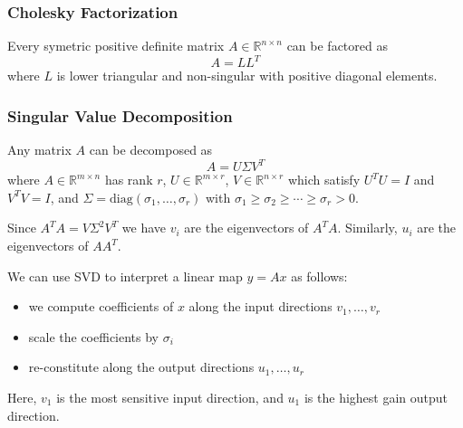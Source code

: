 \documentclass[11pt]{article}
\begin{document}
\subsubsection*{Cholesky Factorization} 
Every symetric positive definite matrix $A \in \mathbb{R}^{n\times n}$ can be factored as 
\[ A = LL^T \] 
where $L$ is lower triangular and non-singular with positive diagonal elements. 
\subsubsection*{Singular Value Decomposition} 
Any matrix $A$ can be decomposed as 
\[ A = U\Sigma V^T \] 
where $A \in \mathbb{R}^{m\times n}$ has rank $r$, $U \in \mathbb{R}^{m\times r}$, $V \in \mathbb{R}^{n\times r}$ which satisfy $U^TU = I$ and $V^TV = I$, and $\Sigma = \mathrm{diag}(\sigma_1, \ldots, \sigma_r)$ with $\sigma_1 \geq \sigma_2 \geq \cdots \geq \sigma_r > 0$. \par 
Since $A^TA = V\Sigma^2V^T$ we have $v_i$ are the eigenvectors of $A^TA$. Similarly, $u_i$ are the eigenvectors of $AA^T$. \par 
We can use SVD to interpret a linear map $y = Ax$ as follows: 
\begin{itemize}
    \item we compute coefficients of $x$ along the input directions $v_1, \ldots, v_r$
    \item scale the coefficients by $\sigma_i$
    \item re-constitute along the output directions $u_1, \ldots, u_r$
\end{itemize}
Here, $v_1$ is the most sensitive input direction, and $u_1$ is the highest gain output direction. 
\end{document}
